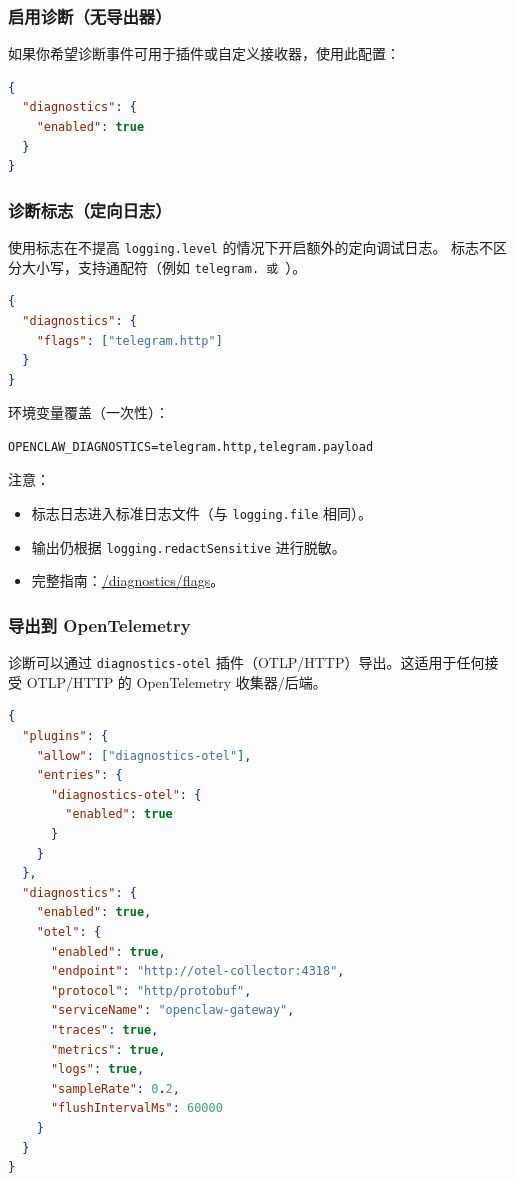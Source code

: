 \subsubsection{启用诊断（无导出器）}


如果你希望诊断事件可用于插件或自定义接收器，使用此配置：

\begin{lstlisting}[language=json]
{
  "diagnostics": {
    "enabled": true
  }
}
\end{lstlisting}


\subsubsection{诊断标志（定向日志）}


使用标志在不提高 \texttt{logging.level} 的情况下开启额外的定向调试日志。
标志不区分大小写，支持通配符（例如 \texttt{telegram.\textit{} 或 \texttt{}}）。

\begin{lstlisting}[language=json]
{
  "diagnostics": {
    "flags": ["telegram.http"]
  }
}
\end{lstlisting}


环境变量覆盖（一次性）：

\begin{lstlisting}
OPENCLAW_DIAGNOSTICS=telegram.http,telegram.payload
\end{lstlisting}


注意：

\begin{itemize}
  \item 标志日志进入标准日志文件（与 \texttt{logging.file} 相同）。
  \item 输出仍根据 \texttt{logging.redactSensitive} 进行脱敏。
  \item 完整指南：\href{/diagnostics/flags}{/diagnostics/flags}。
\end{itemize}


\subsubsection{导出到 OpenTelemetry}


诊断可以通过 \texttt{diagnostics-otel} 插件（OTLP/HTTP）导出。这适用于任何接受 OTLP/HTTP 的 OpenTelemetry 收集器/后端。

\begin{lstlisting}[language=json]
{
  "plugins": {
    "allow": ["diagnostics-otel"],
    "entries": {
      "diagnostics-otel": {
        "enabled": true
      }
    }
  },
  "diagnostics": {
    "enabled": true,
    "otel": {
      "enabled": true,
      "endpoint": "http://otel-collector:4318",
      "protocol": "http/protobuf",
      "serviceName": "openclaw-gateway",
      "traces": true,
      "metrics": true,
      "logs": true,
      "sampleRate": 0.2,
      "flushIntervalMs": 60000
    }
  }
}
\end{lstlisting}


